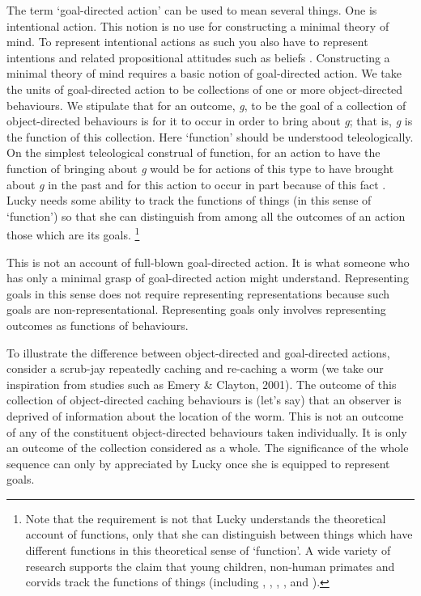 \documentclass[12pt,\papersize]{extarticle}
\begin{document}
The term ‘goal-directed action’ can be used to mean several things.  One is intentional action.  This notion is no use for constructing a minimal theory of mind.  To represent intentional actions as such you also have to represent intentions and related propositional attitudes such as beliefs \citep[]{en_18}.  Constructing a minimal theory of mind requires a basic notion of goal-directed action.  We take the units of goal-directed action to be collections of one or more object-directed behaviours.  We stipulate that for an outcome, \textit{g}, to be the goal of a collection of object-directed behaviours is for it to occur in order to bring about \textit{g}; that is, \textit{g} is the function of this collection.  Here ‘function’ should be understood teleologically.  On the simplest teleological construal of function, for an action to have the function of bringing about \textit{g} would be for actions of this type to have brought about \textit{g} in the past and for this action to occur in part because of this fact \citep[see further][]{en_144, en_141, en_162, en_139, en_161}.  Lucky needs some ability to track the functions of things (in this sense of ‘function’) so that she can distinguish from among all the outcomes of an action those which are its goals.%
\footnote{
Note that the requirement is not that Lucky understands the theoretical account of functions, only that she can distinguish between things which have different functions in this theoretical sense of ‘function’.  A wide variety of research supports the claim that young children, non-human primates and corvids track the functions of things (including 
	\citealp{en_1086},
	\citealp{en_1318},
	\citealp{en_1431},
	\citealp{en_1447},
	\citealp{en_1325} and
	\citealp{en_1708}%
).
}

This is not an account of full-blown goal-directed action.  It is what someone who has only a minimal grasp of goal-directed action might understand.  Representing goals in this sense does not require representing representations because such goals are non-representational.  Representing goals only involves representing outcomes as functions of behaviours. 

To illustrate the difference between object-directed and goal-directed actions, consider a scrub-jay repeatedly caching and re-caching a worm (we take our inspiration from studies such as Emery \& Clayton, 2001).  The outcome of this collection of object-directed caching behaviours is (let’s say) that an observer is deprived of information about the location of the worm.  This is not an outcome of any of the constituent object-directed behaviours taken individually.  It is only an outcome of the collection considered as a whole.  The significance of the whole sequence can only by appreciated by Lucky once she is equipped to represent goals.  
\end{document}
